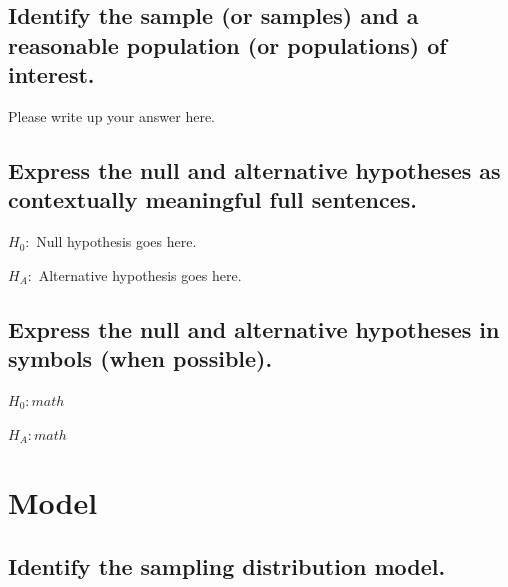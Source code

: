 \documentclass[
]{book}
\begin{document}
\hypertarget{identify-the-sample-or-samples-and-a-reasonable-population-or-populations-of-interest.-2}{%
\subsection*{Identify the sample (or samples) and a reasonable population (or populations) of interest.}\label{identify-the-sample-or-samples-and-a-reasonable-population-or-populations-of-interest.-2}}

Please write up your answer here.

\hypertarget{express-the-null-and-alternative-hypotheses-as-contextually-meaningful-full-sentences.-2}{%
\subsection*{Express the null and alternative hypotheses as contextually meaningful full sentences.}\label{express-the-null-and-alternative-hypotheses-as-contextually-meaningful-full-sentences.-2}}

\(H_{0}:\) Null hypothesis goes here.

\(H_{A}:\) Alternative hypothesis goes here.

\hypertarget{express-the-null-and-alternative-hypotheses-in-symbols-when-possible.-2}{%
\subsection*{Express the null and alternative hypotheses in symbols (when possible).}\label{express-the-null-and-alternative-hypotheses-in-symbols-when-possible.-2}}

\(H_{0}: math\)

\(H_{A}: math\)

\hypertarget{model-2}{%
\section*{Model}\label{model-2}}

\hypertarget{identify-the-sampling-distribution-model.-2}{%
\subsection*{Identify the sampling distribution model.}\label{identify-the-sampling-distribution-model.-2}}
\end{document}
